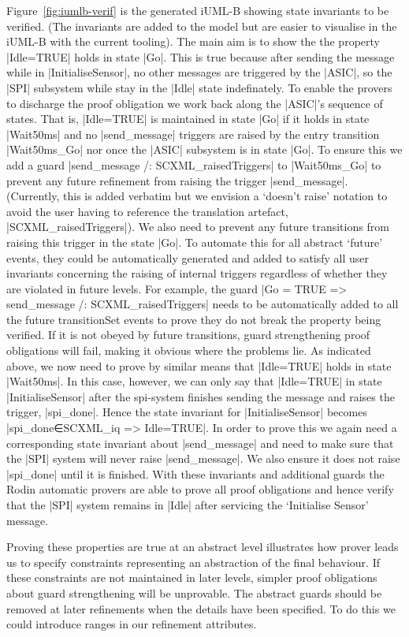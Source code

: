 Figure~\ref{fig:iumlb-verif} is the generated iUML-B showing state invariants to be verified. (The invariants are added to the \SCXML model but are easier to visualise in the iUML-B with the current tooling).
The main aim is to show the the property |Idle=TRUE| holds in state |Go|. 
This is true because after sending the message while in |InitialiseSensor|, no other messages are triggered by the |ASIC|, so the |SPI| subsystem while stay in the |Idle| state indefinately. 
To enable the provers to discharge the proof obligation we work back along the |ASIC|'s sequence of states. 
That is, |Idle=TRUE| is maintained in state |Go| if it holds in state |Wait50ms| and no |send_message| triggers are raised by the entry transition |Wait50ms_Go| nor once the |ASIC| subsystem is in state |Go|. 
To ensure this we add a guard |send_message /: SCXML_raisedTriggers| to |Wait50ms_Go| to prevent any future refinement from raising the trigger |send_message|.
(Currently, this is added verbatim but we envision a `doesn't raise' notation to avoid the user having to reference the translation artefact, |SCXML_raisedTriggers|).
We also need to prevent any future transitions from raising this trigger in the state |Go|.
To automate this for all abstract `future' events, they could be automatically generated and added to satisfy all user invariants concerning the raising of internal triggers regardless of whether they are violated in future levels. 
For example, the guard  |Go = TRUE => send_message /: SCXML_raisedTriggers| needs to be automatically added to all the future transitionSet events to prove they do not break the property being verified. 
If it is not obeyed by future transitions, guard strengthening proof obligations will fail, making it obvious where the problems lie.
As indicated above, we now need to prove by similar means that |Idle=TRUE| holds in state |Wait50ms|. 
In this case, however, we can only say that |Idle=TRUE| in state |InitialiseSensor| after the spi-system finishes sending the message and raises the trigger, |spi_done|. 
Hence the state invariant for |InitialiseSensor| becomes |spi_done∈SCXML_iq => Idle=TRUE|. 
In order to prove this we again need a corresponding state invariant about |send_message| and need to make sure that the |SPI| system will never raise |send_message|.
We also ensure it does not raise |spi_done| until it is finished. 
With these invariants and additional guards the Rodin automatic provers are able to prove all proof obligations and hence verify that the |SPI| system remains in |Idle| after servicing the `Initialise Sensor' message.

Proving these properties are true at an abstract level illustrates how prover leads us to specify constraints representing an abstraction of the final behaviour. If these constraints are not maintained in later levels, simpler proof obligations about guard strengthening will be unprovable. The abstract guards should be removed at later refinements when the details have been specified. To do this we could introduce ranges in our refinement attributes.

